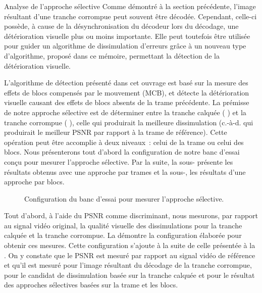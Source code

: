\begin{section}{Analyse de l'approche sélective}
\label{sec-ApprocheSelective}
Comme démontré à la section précédente, l'image résultant d'une tranche
corrompue peut souvent être décodée. Cependant, celle-ci possède, à cause de la
désynchronisation du décodeur lors du décodage, une détérioration visuelle plus
ou moins importante. Elle peut toutefois être utilisée pour guider un algorithme de
dissimulation d'erreurs grâce à un nouveau type d'algorithme, proposé dans ce
mémoire, permettant la détection de la détérioration visuelle.

L'algorithme de détection présenté dans cet ouvrage est basé sur la mesure des
effets de blocs compensés par le mouvement (MCB), et détecte la détérioration
visuelle causant des effets de blocs absents de la trame précédente. La prémisse
de notre approche sélective est de déterminer entre la tranche calquée
( ) et la tranche corrompue (
), celle qui produirait la meilleure dissimulation (c.-à-d.
qui produirait le meilleur PSNR par rapport à la trame de référence). Cette
opération peut être accomplie à deux niveaux~: celui de la trame ou celui des
blocs. Nous présenterons tout d'abord la configuration de notre banc d'essai
conçu pour mesurer l'approche sélective. Par la suite, la
sous- présente les résultats obtenus avec une approche
par trames et la sous-, les résultats d'une approche par
blocs.

\begin{figure}
	\caption[Banc d'essai pour mesurer l'approche sélective]{Configuration du banc
d'essai pour mesurer l'approche sélective.}
	\label{fig-SelectiveSetup}
\end{figure}

Tout d'abord, à l'aide du PSNR comme discriminant, nous mesurons, par rapport au
signal vidéo original, la qualité visuelle des dissimulations pour la tranche
calquée et la tranche corrompue. La  démontre la configuration élaborée pour obtenir ces mesures.
Cette configuration s'ajoute à la suite de celle présentée à la
 . On y constate que le PSNR
est mesuré par rapport au signal vidéo de référence et qu'il est mesuré pour
l'image résultant du décodage de la tranche corrompue, pour le candidat de
dissimulation basée sur la tranche calquée et pour le résultat des approches
sélectives basées sur la trame et les blocs.


\end{section}
